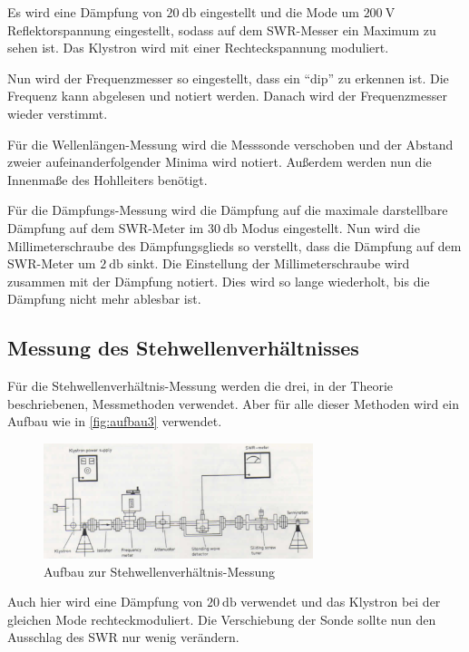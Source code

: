 Es wird eine Dämpfung von $\SI{20}{\decibel}$ eingestellt und die Mode um $\SI{200}{\volt}$ Reflektorspannung eingestellt, sodass auf dem SWR-Messer ein Maximum zu sehen ist.
Das Klystron wird mit einer Rechteckspannung moduliert.

Nun wird der Frequenzmesser so eingestellt, dass ein \enquote{dip} zu erkennen ist.
Die Frequenz kann abgelesen und notiert werden.
Danach wird der Frequenzmesser wieder verstimmt.

Für die Wellenlängen-Messung wird die Messsonde verschoben und der Abstand zweier aufeinanderfolgender Minima wird notiert.
Außerdem werden nun die Innenmaße des Hohlleiters benötigt.

Für die Dämpfungs-Messung wird die Dämpfung auf die maximale darstellbare Dämpfung auf dem SWR-Meter im $\SI{30}{\decibel}$ Modus eingestellt.
Nun wird die Millimeterschraube des Dämpfungsglieds so verstellt, dass die Dämpfung auf dem SWR-Meter um $\SI{2}{\decibel}$ sinkt.
Die Einstellung der Millimeterschraube wird zusammen mit der Dämpfung notiert.
Dies wird so lange wiederholt, bis die Dämpfung nicht mehr ablesbar ist.

\subsection{Messung des Stehwellenverhältnisses}
\label{ssec:Messung_SWR}

Für die Stehwellenverhältnis-Messung werden die drei, in der Theorie beschriebenen, Messmethoden verwendet.
Aber für alle dieser Methoden wird ein Aufbau wie in \autoref{fig:aufbau3} verwendet.

\begin{figure}
    \centering
    \includegraphics[width=0.7\textwidth]{images/aufbau3.png}
    \caption{Aufbau zur Stehwellenverhältnis-Messung \cite{V53_old}}
    \label{fig:aufbau3}
\end{figure}

Auch hier wird eine Dämpfung von $\SI{20}{\decibel}$ verwendet und das Klystron bei der gleichen Mode rechteckmoduliert.
Die Verschiebung der Sonde sollte nun den Ausschlag des SWR nur wenig verändern.

